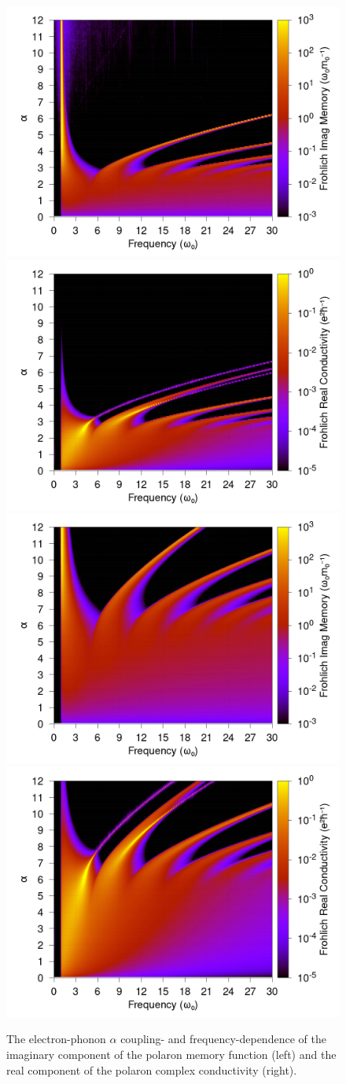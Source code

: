 \begin{figure}[t]
    \centering
    \includegraphics[width=.49\textwidth]{chapters/background/figures/frohlich-2d-imag-memory-alpha-0to12-temp-001-freq-0to30-contourf.png}
    \includegraphics[width=.49\textwidth]{chapters/background/figures/frohlich-2d-real-conductivity-alpha-0to12-temp-001-freq-0to30-contourf.png}
    \includegraphics[width=.49\textwidth]{chapters/background/figures/frohlich-3d-imag-memory-alpha-0to12-temp-001-freq-0to30-contourf.png}
    \includegraphics[width=.49\textwidth]{chapters/background/figures/frohlich-3d-real-conductivity-alpha-0to12-temp-001-freq-0to30-contourf.png}
    \caption{The electron-phonon $\alpha$ coupling- and frequency-dependence of the imaginary component of the polaron memory function (left) and the real component of the polaron complex conductivity (right).}
    \label{fig:gscontour}
\end{figure}
\FloatBarrier  


